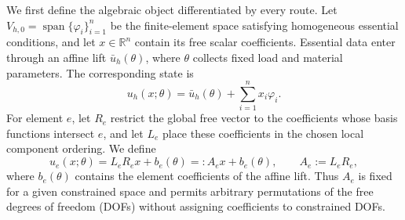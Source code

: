 \label{sec:methodology}

We first define the algebraic object differentiated by every route. Let
$V_{h,0}=\operatorname{span}\{\varphi_i\}_{i=1}^{n}$ be the finite-element
space satisfying homogeneous essential conditions, and let
$x\in\mathbb{R}^n$ contain its free scalar coefficients. Essential data enter
through an affine lift $\bar u_h(\theta)$, where $\theta$ collects fixed load
and material parameters. The corresponding state is
\begin{equation}
  u_h(x;\theta)
  =\bar u_h(\theta)+\sum_{i=1}^{n}x_i\varphi_i.
  \label{eq:constrained-state}
\end{equation}
For element $e$, let $R_e$ restrict the global free vector to the coefficients
whose basis functions intersect $e$, and let $L_e$ place these coefficients
in the chosen local component ordering. We define
\begin{equation}
  u_e(x;\theta)=L_e R_e x+b_e(\theta)=:A_e x+b_e(\theta),
  \qquad A_e:=L_eR_e,
  \label{eq:element-affine-map}
\end{equation}
where $b_e(\theta)$ contains the element coefficients of the affine lift.
Thus $A_e$ is fixed for a given constrained space and permits arbitrary
permutations of the free degrees of freedom (DOFs) without assigning
coefficients to constrained DOFs.

